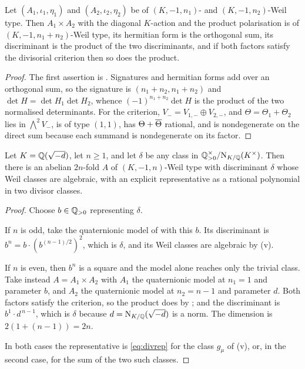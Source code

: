 \begin{lemma}\label{lem:products}
Let $(A_{1},\iota_{1},\eta_{1})$ and $(A_{2},\iota_{2},\eta_{2})$ be of
$(K,-1,n_{1})$- and $(K,-1,n_{2})$-Weil type. Then
$A_{1}\times A_{2}$ with the diagonal $K$-action and the product polarisation
is of $(K,-1,n_{1}+n_{2})$-Weil type, its hermitian form is the orthogonal
sum, its discriminant is the product of the two discriminants, and if both
factors satisfy the divisorial criterion then so does the product.
\end{lemma}

\begin{proof}
The first assertion is . Signatures and hermitian forms add
over an orthogonal sum, so the signature is
$(n_{1}+n_{2},n_{1}+n_{2})$ and $\det H=\det H_{1}\det H_{2}$, whence
$(-1)^{n_{1}+n_{2}}\det H$ is the product of the two normalised determinants.
For the criterion, $V_{-}=V_{1,-}\oplus V_{2,-}$, and
$\Theta=\Theta_{1}+\Theta_{2}$ lies in $\bigwedge^{2}V_{-}$, is of type
$(1,1)$, has $\Theta+\overline{\Theta}$ rational, and is nondegenerate on the
direct sum because each summand is nondegenerate on its factor.
\end{proof}

\begin{theorem}\label{thm:everyfamily}
Let $K=\mathbb{Q}(\sqrt{-d})$, let $n\ge1$, and let $\delta$ be any class in
$\mathbb{Q}^{\times}_{>0}/\mathrm{N}_{K/\mathbb{Q}}(K^{\times})$. Then there is an abelian
$2n$-fold $A$ of $(K,-1,n)$-Weil type with discriminant $\delta$ whose Weil
classes are algebraic, with an explicit representative as a rational
polynomial in two divisor classes.
\end{theorem}

\begin{proof}
Choose $b\in\mathbb{Q}_{>0}$ representing $\delta$.

If $n$ is odd, take the quaternionic model of  with this $b$.
Its discriminant is $b^{n}=b\cdot(b^{(n-1)/2})^{2}$, which is $\delta$, and
its Weil classes are algebraic by (v).

If $n$ is even, then $b^{n}$ is a square and the model alone reaches only the
trivial class. Take instead $A=A_{1}\times A_{2}$ with $A_{1}$ the
quaternionic model at $n_{1}=1$ and parameter $b$, and $A_{2}$ the
quaternionic model at $n_{2}=n-1$ and parameter $d$. Both factors satisfy the
criterion, so the product does by ; and the discriminant is
$b^{1}\cdot d^{\,n-1}$, which is $\delta$ because $d=\mathrm{N}_{K/\mathbb{Q}}(\sqrt{-d})$ is
a norm. The dimension is $2(1+(n-1))=2n$.

In both cases the representative is \eqref{eq:divrep} for the class
$g_{\mu}$ of (v), or, in the second case, for the sum of
the two such classes.
\end{proof}

